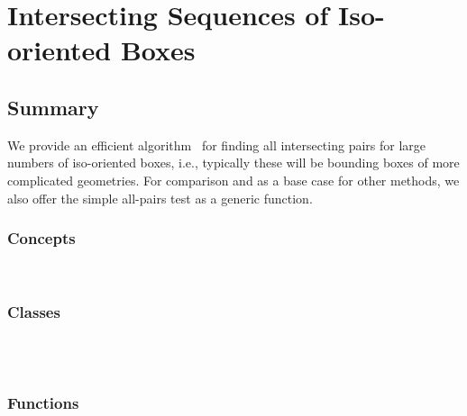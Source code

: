 
\chapter{Intersecting Sequences of Iso-oriented Boxes}

\section*{Summary}

We provide an efficient algorithm~\cite{cgal:ze-fsbi-02} for finding all
intersecting pairs for large numbers of iso-oriented boxes, i.e.,
typically these will be bounding boxes of more complicated geometries.
For comparison and as a base case for other methods, we also offer the
simple all-pairs test as a generic function.

\subsection*{Concepts}

\\

\subsection*{Classes}

\\
\\

\subsection*{Functions}

 \\

